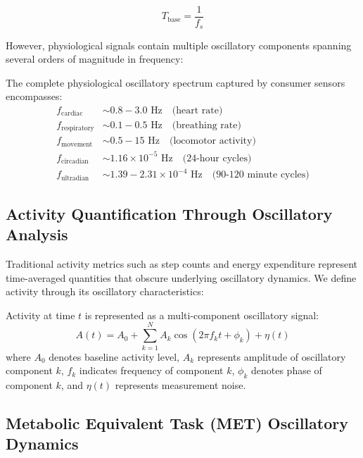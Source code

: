 \begin{equation}
T_{\text{base}} = \frac{1}{f_s}
\end{equation}

However, physiological signals contain multiple oscillatory components spanning several orders of magnitude in frequency:

\begin{definition}
The complete physiological oscillatory spectrum captured by consumer sensors encompasses:
\begin{align}
f_{\text{cardiac}} &\sim 0.8-3.0 \text{ Hz} \quad \text{(heart rate)} \\
f_{\text{respiratory}} &\sim 0.1-0.5 \text{ Hz} \quad \text{(breathing rate)} \\
f_{\text{movement}} &\sim 0.5-15 \text{ Hz} \quad \text{(locomotor activity)} \\
f_{\text{circadian}} &\sim 1.16 \times 10^{-5} \text{ Hz} \quad \text{(24-hour cycles)} \\
f_{\text{ultradian}} &\sim 1.39-2.31 \times 10^{-4} \text{ Hz} \quad \text{(90-120 minute cycles)}
\end{align}
\end{definition}

\subsection{Activity Quantification Through Oscillatory Analysis}

Traditional activity metrics such as step counts and energy expenditure represent time-averaged quantities that obscure underlying oscillatory dynamics. We define activity through its oscillatory characteristics:

\begin{definition}
Activity at time $t$ is represented as a multi-component oscillatory signal:
\begin{equation}
A(t) = A_0 + \sum_{k=1}^{N} A_k \cos(2\pi f_k t + \phi_k) + \eta(t)
\end{equation}
where $A_0$ denotes baseline activity level, $A_k$ represents amplitude of oscillatory component $k$, $f_k$ indicates frequency of component $k$, $\phi_k$ denotes phase of component $k$, and $\eta(t)$ represents measurement noise.
\end{definition}

\subsection{Metabolic Equivalent Task (MET) Oscillatory Dynamics}

